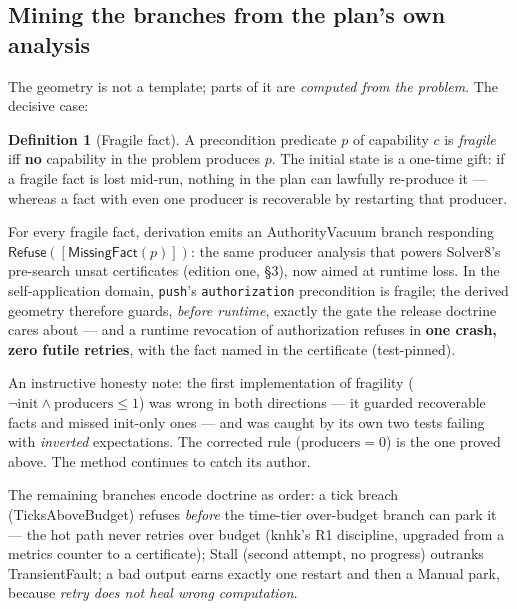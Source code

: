 \documentclass[11pt,a4paper]{article}
\theoremstyle{definition}
\newtheorem{definition}[theorem]{Definition}
\theoremstyle{remark}
\begin{document}
\subsection{Mining the branches from the plan's own analysis}

The geometry is not a template; parts of it are \emph{computed from the
problem}. The decisive case:

\begin{definition}[Fragile fact]
A precondition predicate $p$ of capability $c$ is \emph{fragile} iff
\textbf{no} capability in the problem produces $p$. The initial state is a
one-time gift: if a fragile fact is lost mid-run, nothing in the plan can
lawfully re-produce it --- whereas a fact with even one producer is
recoverable by restarting that producer.
\end{definition}

For every fragile fact, derivation emits an \textsf{AuthorityVacuum}
branch responding $\textsf{Refuse}([\textsf{MissingFact}(p)])$: the same
producer analysis that powers Solver8's pre-search unsat certificates
(edition one, \S3), now aimed at runtime loss. In the self-application
domain, \texttt{push}'s \texttt{authorization} precondition is fragile;
the derived geometry therefore guards, \emph{before runtime}, exactly the
gate the release doctrine cares about --- and a runtime revocation of
authorization refuses in \textbf{one crash, zero futile retries}, with the
fact named in the certificate (test-pinned).

An instructive honesty note: the first implementation of fragility
($\neg\mathrm{init} \wedge \mathrm{producers} \le 1$) was wrong in both
directions --- it guarded recoverable facts and missed init-only ones ---
and was caught by its own two tests failing with \emph{inverted}
expectations. The corrected rule ($\mathrm{producers} = 0$) is the one
proved above. The method continues to catch its author.

The remaining branches encode doctrine as order: a tick breach
(\textsf{TicksAboveBudget}) refuses \emph{before} the time-tier
over-budget branch can park it --- the hot path never retries over budget
(knhk's R1 discipline, upgraded from a metrics counter to a certificate);
\textsf{Stall} (second attempt, no progress) outranks
\textsf{TransientFault}; a bad output earns exactly one restart and then a
\textsf{Manual} park, because \emph{retry does not heal wrong
computation}.

\end{document}
